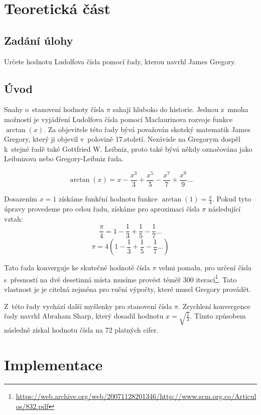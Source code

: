 \documentclass[11pt,a4paper]{report}
\begin{document}
	
	
	
	\setcounter{tocdepth}{2}
	\tableofcontents
	
	\chapter{Teoretická část}
	\pagestyle{fancy}
		
	\section{Zadání úlohy}
	Určete hodnotu Ludolfova čísla pomocí řady, kterou navrhl James Gregory.
	
	\section{Úvod}
	Snahy o~stanovení hodnoty čísla $\pi$ sahají hluboko do historie. Jednou z~mnoha možností je vyjádření Ludolfova čísla pomocí Maclaurinova rozvoje funkce $\arctan(x)$. Za objevitele této řady bývá považován skotský matematik James Gregory, který ji objevil v~polovině 17.století. Nezávisle na Gregorym dospěl k~stejné řadě také  Gottfried W. 
    Leibniz, proto také bývá někdy označována jako Leibnizova nebo Gregory-Leibniz řada.
    
    $$\arctan(x) = x-\frac{x^3}{3}+\frac{x^5}{5}-\frac{x^7}{7}+\frac{x^9}{9}...$$
    
    Dosazením $x = 1$ získáme funkční hodnotu funkce $\arctan(1)=\frac{\pi}{4}$. Pokud tyto úpravy provedeme pro celou řadu, získáme pro aproximaci čísla $\pi$ následující vztah:
    $$\frac{\pi}{4}=1-\frac{1}{3}+\frac{1}{5}-\frac{1}{7}...$$
    $$\pi=4\left(1-\frac{1}{3}+\frac{1}{5}-\frac{1}{7}...\right)$$
    
    Tato řada konverguje ke skutečné hodnotě čísla $\pi$ velmi pomalu, pro určení čísla s~přesností na dvě desetinná místa musíme provést téměř 300 iterací\footnote{\url{https://web.archive.org/web/20071128201346/http://www.scm.org.co/Articulos/832.pdf}}. Tato vlastnost je je citelná zejména pro ruční výpočty, které musel Gregory provádět.
    
    Z~této řady vychází další myšlenky pro stanovení čísla $\pi$. Zrychlení konvergence řady navrhl Abraham Sharp, který dosadil hodnotu $x=\sqrt{\frac{1}{3}}$. Tímto způsobem následně získal hodnotu čísla na 72 platných cifer.
	

	\chapter{Implementace}
\end{document}
